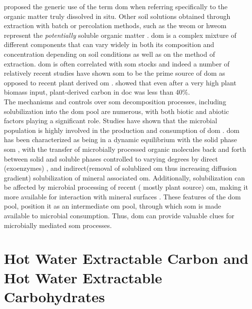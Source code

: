 	\citet{zsolnay2003} proposed the generic use of the term \gls{dom} when referring specifically to the organic matter truly dissolved in situ. Other soil solutions obtained through extraction with batch or percolation methods, such as the \gls{weom} or \gls{hweom} represent the \textit{potentially} soluble organic matter \citep{marschner2003}. \gls{dom} is a complex mixture of different components that can vary widely in both its composition and concentration depending on soil conditions  as well as on the method of extraction\citep{bolan2011}. \gls{dom} is often  correlated with \gls{som} stocks and indeed a number of relatively recent studies have shown \gls{som} to be the prime source of \gls{dom} as opposed to  recent plant derived \gls{om} \citep{malik2013, kaiser2012}. \citet{malik2013}showed that  even after a very high plant biomass input, plant-derived carbon in \gls{doc} was less than 40\%.\\
	The mechanisms and controls over \gls{som} decomposition processes, including solubilization  into the \gls{dom} pool are numerous, with both biotic and abiotic factors playing a significant role\citep{kalbitz2000, bolan2011}. Studies have shown that the microbial population is highly involved in the production and consumption of \gls{dom} \citep{marschnerp2002, malik2013, guggenberger1998}.  \gls{dom} has been characterized as being in a dynamic equilibrium with the solid phase \gls{som} \citep{roth2019, kaiser2012},  with the transfer of microbially processed organic molecules back and forth between solid and soluble phases controlled to varying degrees by  direct (exoenzymes) \citep{guggenberger1998},  and indirect(removal of solublized \gls{om} thus increasing diffusion gradient) solubilization of mineral associated \gls{om}. Additionally, solubilization can be affected by microbial processing of recent ( mostly plant source) \gls{om}, making it more available for interaction with mineral surfaces \citep{kalbitz2003, kalbitz2008}. These features of the \gls{dom} pool, position it as an intermediate \gls{om} pool, through which \gls{som} is made available to microbial consumption. Thus, \gls{dom} can provide valuable clues for microbially mediated \gls{som} processes. \\

\section{Hot Water Extractable Carbon and Hot Water Extractable Carbohydrates}

